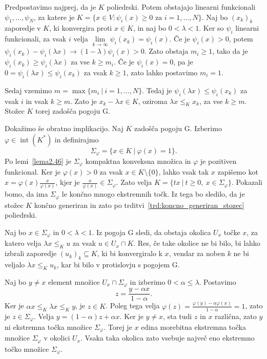 \documentclass[mat2, tisk]{fmfdelo}
\begin{document}
\begin{dokaz}
Predpostavimo najprej, da je $K$ poliedrski. Potem
obstajajo linearni funkcionali $\psi_1,\ldots,\psi_N$, za katere je
$K = \{x\in V:\psi_i(x)\geq0
\text{ za }i=1,\ldots,N\}$.
Naj bo $(x_k)_k$ zaporedje v $K$, ki konvergira proti $x\in K$, in naj
bo $0<\lambda<1$. Ker so $\psi_i$ linearni funkcionali, za vsak $i$ velja
$\lim\limits_{k\to\infty}\psi_i(x_k)=\psi_i(x)$.
Če je $\psi_i(x)>0$, potem
$\psi_i(x_k)-\psi_i(\lambda x)
\longrightarrow
(1-\lambda)\psi_i(x)>0$.
Zato obstaja $m_i\geq1$, tako da je
$\psi_i(x_k)\geq\psi_i(\lambda x)$ za vse $k\geq m_i$. Če je
$\psi_i(x)=0$, pa je
$0=\psi_i(\lambda x)\leq\psi_i(x_k)$
za vsak $k\geq1$, zato lahko postavimo $m_i=1$.

Sedaj vzemimo $m=\max\{m_i~|~i=1,\ldots,N\}$.
Tedaj je $\psi_i(\lambda x)\leq\psi_i(x_k)$ za vsak $i$ in vsak
$k\geq m$. Zato je $x_k-\lambda x\in K$, oziroma
$\lambda x\leq_K x_k$, za vse $k\geq m$. Stožec $K$ torej zadošča
pogoju G.

Dokažimo še obratno implikacijo. Naj $K$ zadošča pogoju G. Izberimo
$\varphi\in\operatorname{int}(K^*)$ in definirajmo
\[
\Sigma_\varphi
=
\{x\in K~|~\varphi(x)=1\}.
\]
Po lemi~\ref{lema2.46} je $\Sigma_\varphi$ kompaktna konveksna
množica in $\varphi$ je pozitiven funkcional.
Ker je $\varphi(x)>0$ za vsak $x\in K\setminus\{0\}$,
lahko vsak tak $x$ zapišemo kot $x=\varphi(x)\frac{x}{\varphi(x)}$,
kjer je $\frac{x}{\varphi(x)}\in\Sigma_\varphi$.
Zato velja $K=\{tx ~|~ t\geq0,\ x\in\Sigma_\varphi\}.$
Pokazali bomo, da ima $\Sigma_\varphi$ le končno
mnogo ekstremnih točk. Iz tega bo sledilo, da
je stožec $K$ končno generiran in zato po
trditvi~\ref{trd:koncno_generiran_stozec}
poliedrski.

Naj bo $x\in\Sigma_\varphi$ in $0<\lambda<1$. Iz pogoja G sledi, da
obstaja okolica $U_x$ točke $x$, za katero velja
$\lambda x\leq_K u$
za vsak $u\in U_x\cap K$.
Res, če take okolice ne bi bilo, bi lahko izbrali zaporedje
$(u_k)_k\subseteq K$, ki bi konvergiralo k $x$, vendar za noben $k$
ne bi veljalo $\lambda x\leq_K u_k$, kar bi bilo v protislovju s
pogojem G.

Naj bo $y\neq x$ element množice $U_x\cap\Sigma_\varphi$ in izberimo
$0<\alpha\leq\lambda$. Postavimo
\begin{equation*}
z
=
\frac{y-\alpha x}{1-\alpha}.
\end{equation*}
Ker je $\alpha x\leq_K\lambda x\leq_K y$, je $z\in K$. Poleg tega velja
$\varphi(z)
=
\frac{\varphi(y)-\alpha\varphi(x)}{1-\alpha}
=
1$,
zato je $z\in\Sigma_\varphi$. Velja
$y=(1-\alpha)z+\alpha x$.
Ker je $y\neq x$, sta tudi $z$ in $x$ različna, zato $y$ ni
ekstremna točka množice $\Sigma_\varphi$.
Torej je $x$ edina morebitna ekstremna točka
množice $\Sigma_\varphi$ v okolici $U_x$.
Vsaka taka okolica zato vsebuje največ eno
ekstremno točko množice $\Sigma_\varphi$.


\end{dokaz}
\end{document}
